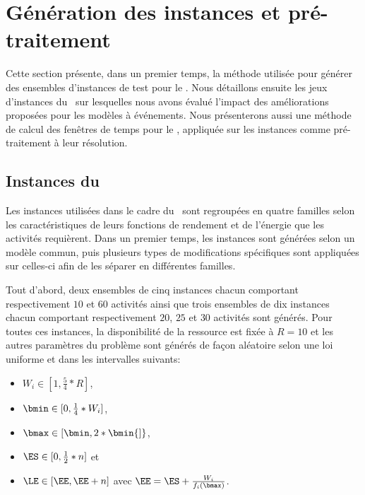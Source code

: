 \section{Génération des instances et pré-traitement}
\label{sec:instance}
Cette section présente, dans un premier temps, la méthode utilisée
pour générer des ensembles d'instances de test pour le \CECSP. Nous
détaillons ensuite les jeux d'instances du \RCPSP~sur lesquelles nous
avons évalué l'impact des améliorations proposées pour les modèles à
événements. Nous présenterons aussi une méthode de calcul des fenêtres
de temps pour le \RCPSP, appliquée sur les instances comme
pré-traitement à leur résolution.

\subsection{Instances du \CECSP}
\label{sec:instance_CECSP}
Les instances utilisées dans le cadre du \CECSP~sont regroupées en
quatre familles selon les caractéristiques de leurs fonctions de
rendement et de l'énergie que les activités requièrent. Dans un
premier temps, les instances sont générées selon un modèle commun,
puis plusieurs types de modifications spécifiques sont appliquées sur
celles-ci afin de les séparer en différentes familles. 

Tout d'abord, deux ensembles de cinq instances chacun comportant
respectivement $10$ et $60$ activités ainsi que trois ensembles de dix
instances chacun comportant respectivement $20$, $25$ et $30$ activités sont
générés. Pour toutes ces instances, la disponibilité de la ressource
est fixée à $R=10$ et les autres paramètres du problème sont générés
de façon aléatoire selon une loi uniforme et dans les intervalles
suivants:
\begin{itemize}
\item $W_i \in [1 , \frac{5}{4} * R]$,
\item $\bmin \in [0, \frac{1}{4} * W_i]$,
\item $\bmax \in [\bmin , 2 * \bmin {]}$,
\item $\ES \in [0,\frac{1}{2}*n]$ et
\item $\LE \in [ \EE, \EE + n ]$ avec $\EE = \ES +
\frac{W_i}{f_i(\bmax)}$.
\end{itemize}

